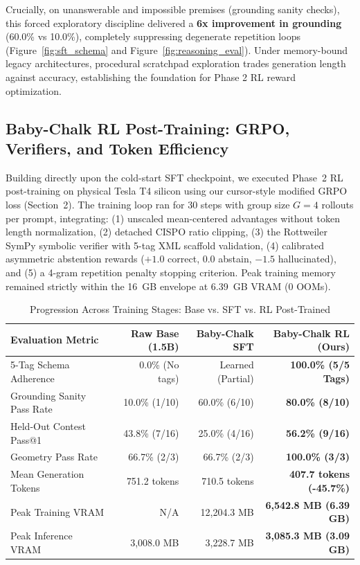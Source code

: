 \documentclass[10pt,twocolumn,letterpaper]{article}
\begin{document}
Crucially, on unanswerable and impossible premises (grounding sanity checks), this forced exploratory discipline delivered a \textbf{6x improvement in grounding} (60.0\% vs 10.0\%), completely suppressing degenerate repetition loops (Figure~\ref{fig:sft_schema} and Figure~\ref{fig:reasoning_eval}). Under memory-bound legacy architectures, procedural scratchpad exploration trades generation length against accuracy, establishing the foundation for Phase 2 RL reward optimization.

\subsection{Baby-Chalk RL Post-Training: GRPO, Verifiers, and Token Efficiency}
Building directly upon the cold-start SFT checkpoint, we executed Phase~2 RL post-training on physical Tesla T4 silicon using our cursor-style modified GRPO loss (Section~2). The training loop ran for 30 steps with group size $G=4$ rollouts per prompt, integrating: (1) unscaled mean-centered advantages without token length normalization, (2) detached CISPO ratio clipping, (3) the Rottweiler SymPy symbolic verifier with 5-tag XML scaffold validation, (4) calibrated asymmetric abstention rewards ($+1.0$ correct, $0.0$ abstain, $-1.5$ hallucinated), and (5) a 4-gram repetition penalty stopping criterion. Peak training memory remained strictly within the 16~GB envelope at 6.39~GB VRAM (0 OOMs).

\begin{table}[h]
\centering
\caption{Progression Across Training Stages: Base vs. SFT vs. RL Post-Trained}
\label{tab:rl_eval_progression}
\small
\begin{tabular}{lrrr}
\toprule
Evaluation Metric & Raw Base (1.5B) & Baby-Chalk SFT & Baby-Chalk RL (Ours) \\
\midrule
5-Tag Schema Adherence      & 0.0\% (No tags)       & Learned (Partial)     & \textbf{100.0\% (5/5 Tags)} \\
Grounding Sanity Pass Rate  & 10.0\% (1/10)         & 60.0\% (6/10)         & \textbf{80.0\% (8/10)} \\
Held-Out Contest Pass@1     & 43.8\% (7/16)         & 25.0\% (4/16)         & \textbf{56.2\% (9/16)} \\
Geometry Pass Rate          & 66.7\% (2/3)          & 66.7\% (2/3)          & \textbf{100.0\% (3/3)} \\
Mean Generation Tokens      & 751.2 tokens          & 710.5 tokens          & \textbf{407.7 tokens (-45.7\%)} \\
Peak Training VRAM          & N/A                   & 12,204.3 MB           & \textbf{6,542.8 MB (6.39 GB)} \\
Peak Inference VRAM         & 3,008.0 MB            & 3,228.7 MB            & \textbf{3,085.3 MB (3.09 GB)} \\
\bottomrule
\end{tabular}
\end{table}
\end{document}
